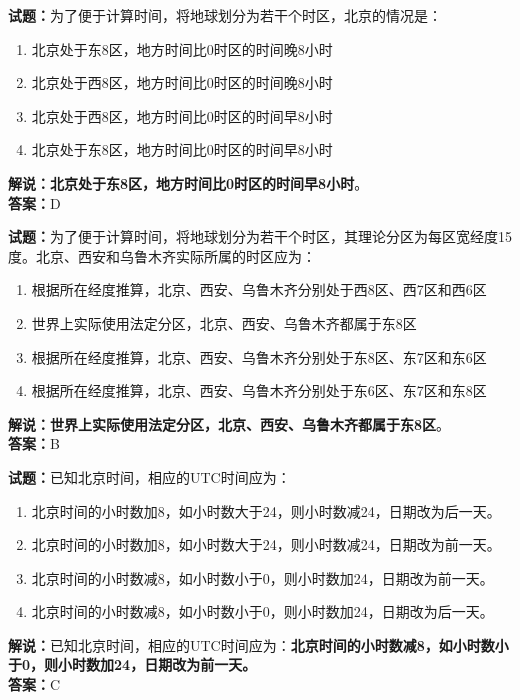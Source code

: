\documentclass{ctexbook}
\begin{document}
\bigskip


\noindent\textbf{试题：}为了便于计算时间，将地球划分为若干个时区，北京的情况是：
\begin{enumerate}[leftmargin=3em]
\item 北京处于东8区，地方时间比0时区的时间晚8小时
\item 北京处于西8区，地方时间比0时区的时间晚8小时
\item 北京处于西8区，地方时间比0时区的时间早8小时
\item 北京处于东8区，地方时间比0时区的时间早8小时
\end{enumerate}
\noindent\textbf{解说：}\textbf{北京处于东8区，地方时间比0时区的时间早8小时}。\\\noindent\textbf{答案：}D




\bigskip


\noindent\textbf{试题：}为了便于计算时间，将地球划分为若干个时区，其理论分区为每区宽经度15度。北京、西安和乌鲁木齐实际所属的时区应为：
\begin{enumerate}[leftmargin=3em]
\item 根据所在经度推算，北京、西安、乌鲁木齐分别处于西8区、西7区和西6区
\item 世界上实际使用法定分区，北京、西安、乌鲁木齐都属于东8区
\item 根据所在经度推算，北京、西安、乌鲁木齐分别处于东8区、东7区和东6区
\item 根据所在经度推算，北京、西安、乌鲁木齐分别处于东6区、东7区和东8区
\end{enumerate}
\noindent\textbf{解说：}\textbf{世界上实际使用法定分区，北京、西安、乌鲁木齐都属于东8区}。\\\noindent\textbf{答案：}B




\bigskip


\noindent\textbf{试题：}已知北京时间，相应的UTC时间应为：
\begin{enumerate}[leftmargin=3em]
\item 北京时间的小时数加8，如小时数大于24，则小时数减24，日期改为后一天。
\item 北京时间的小时数加8，如小时数大于24，则小时数减24，日期改为前一天。
\item 北京时间的小时数减8，如小时数小于0，则小时数加24，日期改为前一天。
\item 北京时间的小时数减8，如小时数小于0，则小时数加24，日期改为后一天。
\end{enumerate}
\noindent\textbf{解说：}已知北京时间，相应的UTC时间应为：\textbf{北京时间的小时数减8，如小时数小于0，则小时数加24，日期改为前一天。}\\\noindent\textbf{答案：}C
\end{document}
